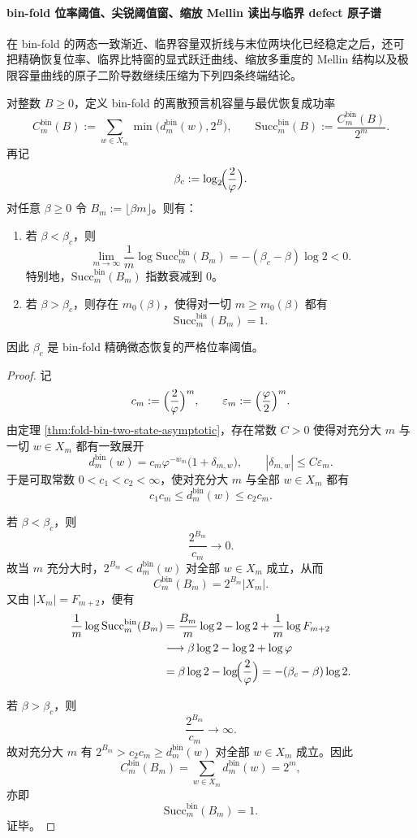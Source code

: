 \paragraph{bin-fold 位率阈值、尖锐阈值窗、缩放 Mellin 读出与临界 defect 原子谱}
在 bin-fold 的两态一致渐近、临界容量双折线与末位两块化已经稳定之后，还可把精确恢复位率、临界比特窗的显式跃迁曲线、缩放多重度的 Mellin 结构以及极限容量曲线的原子二阶导数继续压缩为下列四条终端结论。

\begin{theorem}\label{thm:xi-binfold-oracle-success-bitrate-threshold-exact}
对整数 \(B\ge 0\)，定义 bin-fold 的离散预言机容量与最优恢复成功率
\[
C_m^{\mathrm{bin}}(B)
:=
\sum_{w\in X_m}\min\bigl(d_m^{\mathrm{bin}}(w),2^B\bigr),
\qquad
\mathrm{Succ}_m^{\mathrm{bin}}(B):=\frac{C_m^{\mathrm{bin}}(B)}{2^m}.
\]
再记
\[
\beta_c:=\log_2\!\Bigl(\frac{2}{\varphi}\Bigr).
\]
对任意 \(\beta\ge 0\) 令 \(B_m:=\lfloor \beta m\rfloor\)。则有：
\begin{enumerate}
\item 若 \(\beta<\beta_c\)，则
\[
\lim_{m\to\infty}\frac{1}{m}\log \mathrm{Succ}_m^{\mathrm{bin}}(B_m)
=
-(\beta_c-\beta)\log 2<0.
\]
特别地，\(\mathrm{Succ}_m^{\mathrm{bin}}(B_m)\) 指数衰减到 \(0\)。
\item 若 \(\beta>\beta_c\)，则存在 \(m_0(\beta)\)，使得对一切 \(m\ge m_0(\beta)\) 都有
\[
\mathrm{Succ}_m^{\mathrm{bin}}(B_m)=1.
\]
\end{enumerate}
因此 \(\beta_c\) 是 bin-fold 精确微态恢复的严格位率阈值。
\end{theorem}
\begin{proof}
记
\[
c_m:=\Bigl(\frac{2}{\varphi}\Bigr)^m,
\qquad
\varepsilon_m:=\Bigl(\frac{\varphi}{2}\Bigr)^m.
\]
由定理 \ref{thm:fold-bin-two-state-asymptotic}，存在常数 \(C>0\) 使得对充分大 \(m\) 与一切 \(w\in X_m\) 都有一致展开
\[
d_m^{\mathrm{bin}}(w)=c_m\varphi^{-w_m}\bigl(1+\delta_{m,w}\bigr),
\qquad
|\delta_{m,w}|\le C\varepsilon_m.
\]
于是可取常数 \(0<c_1<c_2<\infty\)，使对充分大 \(m\) 与全部 \(w\in X_m\) 都有
\[
c_1c_m\le d_m^{\mathrm{bin}}(w)\le c_2c_m.
\]

若 \(\beta<\beta_c\)，则
\[
\frac{2^{B_m}}{c_m}\longrightarrow 0.
\]
故当 \(m\) 充分大时，\(2^{B_m}<d_m^{\mathrm{bin}}(w)\) 对全部 \(w\in X_m\) 成立，从而
\[
C_m^{\mathrm{bin}}(B_m)=2^{B_m}|X_m|.
\]
又由 \(|X_m|=F_{m+2}\)，便有
\[
\begin{aligned}
\frac{1}{m}\log \mathrm{Succ}_m^{\mathrm{bin}}(B_m)
&=
\frac{B_m}{m}\log 2-\log 2+\frac{1}{m}\log F_{m+2}\\
&\longrightarrow
\beta\log 2-\log 2+\log\varphi\\
&=
\beta\log 2-\log\!\Bigl(\frac{2}{\varphi}\Bigr)
=
-(\beta_c-\beta)\log 2.
\end{aligned}
\]

若 \(\beta>\beta_c\)，则
\[
\frac{2^{B_m}}{c_m}\longrightarrow \infty.
\]
故对充分大 \(m\) 有 \(2^{B_m}>c_2c_m\ge d_m^{\mathrm{bin}}(w)\) 对全部 \(w\in X_m\) 成立。因此
\[
C_m^{\mathrm{bin}}(B_m)=\sum_{w\in X_m}d_m^{\mathrm{bin}}(w)=2^m,
\]
亦即
\[
\mathrm{Succ}_m^{\mathrm{bin}}(B_m)=1.
\]
证毕。
\end{proof}

